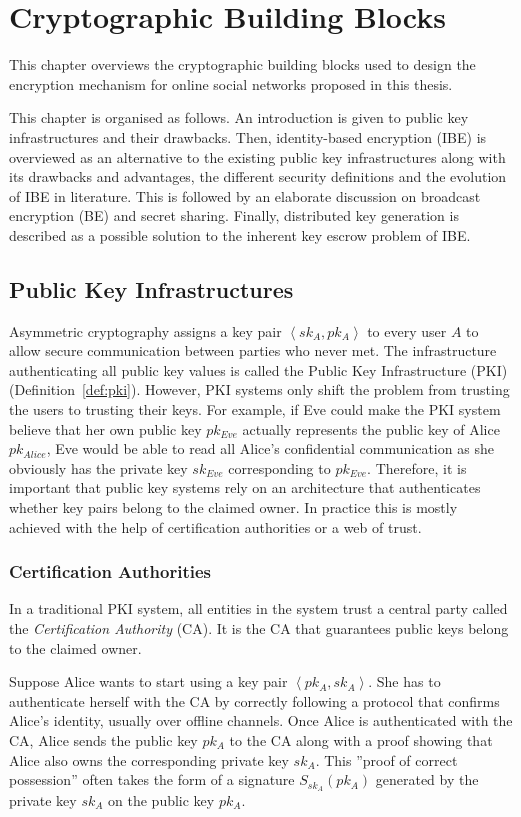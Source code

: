 \chapter{Cryptographic Building Blocks}
\label{cha:2}
This chapter overviews the cryptographic building blocks used to design the encryption mechanism for online social networks proposed in this thesis.

This chapter is organised as follows. An introduction is given to public key infrastructures and their drawbacks. Then, identity-based encryption (IBE) is overviewed as an alternative to the existing public key infrastructures along with its drawbacks and advantages, the different security definitions and the evolution of IBE in literature. This is followed by an elaborate discussion on broadcast encryption (BE) and secret sharing. Finally, distributed key generation is described as a possible solution to the inherent key escrow problem of IBE.

\section{Public Key Infrastructures}
Asymmetric cryptography assigns a key pair $\left< sk_A, pk_A \right>$ to every user $A$ to allow secure communication between parties who never met. The infrastructure authenticating all public key values is called the Public Key Infrastructure (PKI) (Definition~\ref{def:pki}). However, PKI systems only shift the problem from trusting the users to trusting their keys. For example, if Eve could make the PKI system believe that her own public key $pk_{Eve}$ actually represents the public key of Alice $pk_{Alice}$, Eve would be able to read all Alice's confidential communication as she obviously has the private key $sk_{Eve}$ corresponding to $pk_{Eve}$. Therefore, it is important that public key systems rely on an architecture that authenticates whether key pairs belong to the claimed owner. In practice this is mostly achieved with the help of certification authorities or a web of trust.

\subsection{Certification Authorities}
In a traditional PKI system, all entities in the system trust a central party called the \textit{Certification Authority} (CA). It is the CA that guarantees public keys belong to the claimed owner.

Suppose Alice wants to start using a key pair $\left< pk_A, sk_A \right>$. She has to authenticate herself with the CA by correctly following a protocol that confirms Alice's identity, usually over offline channels. Once Alice is authenticated with the CA, Alice sends the public key $pk_A$ to the CA along with a proof showing that Alice also owns the corresponding private key $sk_A$. This ''proof of correct possession'' often takes the form of a signature $S_{sk_A} \left( pk_A \right)$ generated by the private key $sk_A$ on the public key $pk_A$.

